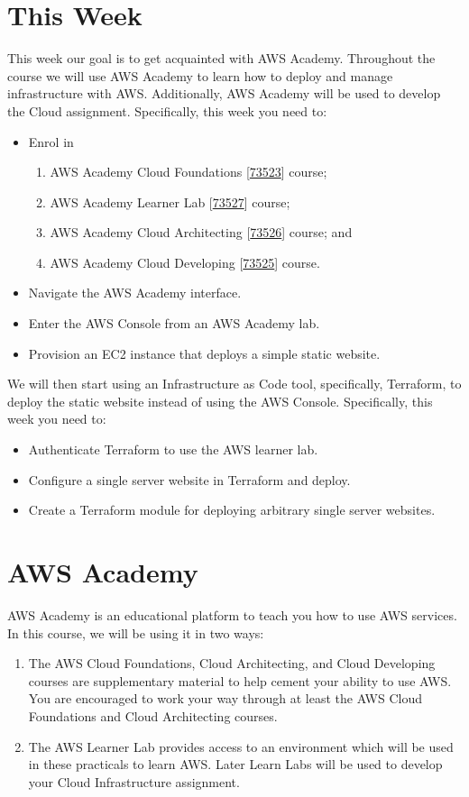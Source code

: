 \documentclass{csse4400}
\begin{document}
\section{This Week}
This week our goal is to get acquainted with AWS Academy.
Throughout the course we will use AWS Academy to learn how to deploy and manage infrastructure with AWS.
Additionally, AWS Academy will be used to develop the Cloud assignment.
Specifically, this week you need to:
\begin{itemize}
    \item Enrol in
    \begin{enumerate}
        \item AWS Academy Cloud Foundations [\href{https://awsacademy.instructure.com/courses/73523}{73523}] course;
        \item AWS Academy Learner Lab [\href{https://awsacademy.instructure.com/courses/73527}{73527}] course;
        \item AWS Academy Cloud Architecting [\href{https://awsacademy.instructure.com/courses/73526}{73526}] course; and
        \item AWS Academy Cloud Developing [\href{https://awsacademy.instructure.com/courses/73525}{73525}] course.
    \end{enumerate}
    \item Navigate the AWS Academy interface.
    \item Enter the AWS Console from an AWS Academy lab.
    \item Provision an EC2 instance that deploys a simple static website.
\end{itemize}

We will then start using an Infrastructure as Code tool,
specifically, Terraform,
to deploy the static website instead of using the AWS Console.
Specifically, this week you need to:
\begin{itemize}
    \item Authenticate Terraform to use the AWS learner lab.
    \item Configure a single server website in Terraform and deploy.
    \item Create a Terraform module for deploying arbitrary single server websites.
\end{itemize}

\section{AWS Academy}
AWS Academy is an educational platform to teach you how to use AWS services.
In this course, we will be using it in two ways:
\begin{enumerate}
    \item The AWS Cloud Foundations, Cloud Architecting, and Cloud Developing courses are supplementary material to help cement your ability to use AWS.
        You are encouraged to work your way through at least the AWS Cloud Foundations and Cloud Architecting courses.
    \item The AWS Learner Lab provides access to an environment which will be used in these practicals to learn AWS. 
        Later Learn Labs will be used to develop your Cloud Infrastructure assignment.
\end{enumerate}
\end{document}
